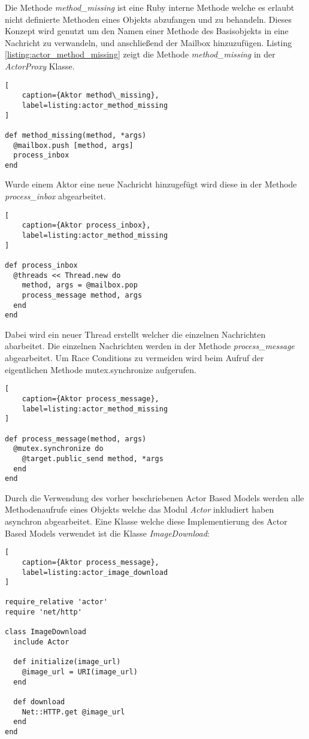 Die Methode \emph{method\_missing} ist eine Ruby interne Methode welche es erlaubt nicht definierte Methoden eines Objekts abzufangen und zu behandeln. Dieses Konzept wird genutzt um den Namen einer Methode des Basisobjekts in eine Nachricht zu verwandeln, und anschließend der Mailbox hinzuzufügen. Listing \ref{listing:actor_method_missing} zeigt die Methode \emph{method\_missing} in der \emph{ActorProxy} Klasse. 

\begin{lstlisting}[
	caption={Aktor method\_missing},
	label=listing:actor_method_missing
]

def method_missing(method, *args)
  @mailbox.push [method, args]
  process_inbox
end
\end{lstlisting}


Wurde einem Aktor eine neue Nachricht hinzugefügt wird diese in der Methode \emph{process\_inbox} abgearbeitet. 

\begin{lstlisting}[
	caption={Aktor process_inbox},
	label=listing:actor_method_missing
]

def process_inbox
  @threads << Thread.new do
    method, args = @mailbox.pop
    process_message method, args
  end
end
\end{lstlisting}	

Dabei wird ein neuer Thread erstellt welcher die einzelnen Nachrichten abarbeitet. Die einzelnen Nachrichten werden in der Methode \emph{process\_message} abgearbeitet. Um Race Conditions zu vermeiden wird beim Aufruf der eigentlichen Methode mutex.synchronize aufgerufen. 


\begin{lstlisting}[
	caption={Aktor process_message},
	label=listing:actor_method_missing
]

def process_message(method, args)
  @mutex.synchronize do
    @target.public_send method, *args
  end
end
\end{lstlisting}	

Durch die Verwendung des vorher beschriebenen Actor Based Models werden alle Methodenaufrufe eines Objekts welche das Modul \emph{Actor} inkludiert haben asynchron abgearbeitet. Eine Klasse welche diese Implementierung des Actor Based Models verwendet ist die Klasse \emph{ImageDownload}:

\begin{lstlisting}[
	caption={Aktor process_message},
	label=listing:actor_image_download
]

require_relative 'actor'
require 'net/http'

class ImageDownload
  include Actor

  def initialize(image_url)
    @image_url = URI(image_url)
  end

  def download
    Net::HTTP.get @image_url
  end
end
\end{lstlisting}

